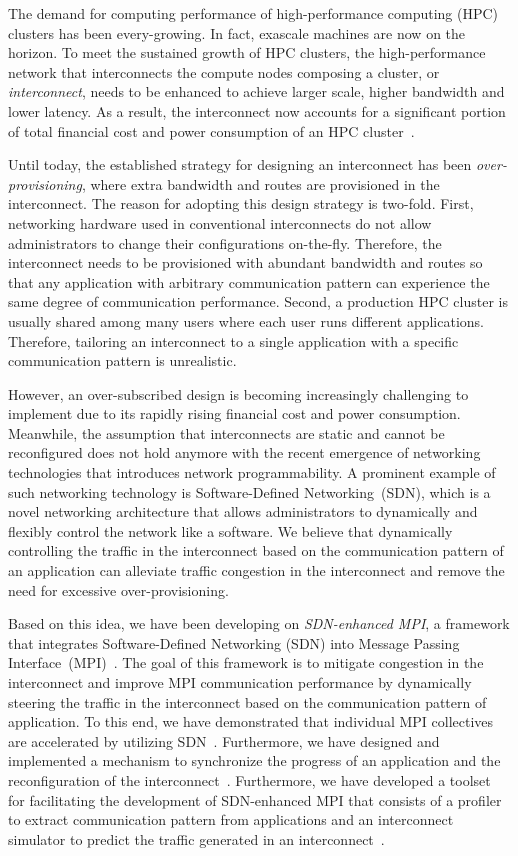\documentclass[graybox]{svmult}
\begin{document}
The demand for computing performance of high-performance computing (HPC)
clusters has been every-growing. In fact, exascale machines are now on the
horizon. To meet the sustained growth of HPC clusters, the high-performance
network that interconnects the compute nodes composing a cluster, or
\textit{interconnect}, needs to be enhanced to achieve larger scale, higher
bandwidth and lower latency. As a result, the interconnect now accounts for a
significant portion of total financial cost and power consumption of an HPC
cluster~\cite{Michelogiannakis2017}.

Until today, the established strategy for designing an interconnect has been
\textit{over-provisioning}, where extra bandwidth and routes are provisioned
in the interconnect. The reason for adopting this design strategy is two-fold.
First, networking hardware used in conventional interconnects do not allow
administrators to change their configurations on-the-fly. Therefore, the
interconnect needs to be provisioned with abundant bandwidth and routes so
that any application with arbitrary communication pattern can experience the
same degree of communication performance. Second, a production HPC cluster is
usually shared among many users where each user runs different applications.
Therefore, tailoring an interconnect to a single application with a specific
communication pattern is unrealistic.

However, an over-subscribed design is becoming increasingly challenging to
implement due to its rapidly rising financial cost and power consumption.
Meanwhile, the assumption that interconnects are static and cannot be
reconfigured does not hold anymore with the recent emergence of networking
technologies that introduces network programmability. A prominent example of
such networking technology is Software-Defined Networking~(SDN), which is a
novel networking architecture that allows administrators to dynamically and
flexibly control the network like a software. We believe that dynamically
controlling the traffic in the interconnect based on the communication pattern
of an application can alleviate traffic congestion in the interconnect and
remove the need for excessive over-provisioning.

Based on this idea, we have been developing on \textit{SDN-enhanced MPI}, a
framework that integrates Software-Defined Networking (SDN) into Message
Passing Interface~(MPI)~\cite{MPIForum2012}. The goal of this framework is to
mitigate congestion in the interconnect and improve MPI communication
performance by dynamically steering the traffic in the interconnect based on
the communication pattern of application. To this end, we have demonstrated
that individual MPI collectives are accelerated by utilizing
SDN~\cite{Dashdavaa2014,Takahashi2014}. Furthermore, we have designed and
implemented a mechanism to synchronize the progress of an application and the
reconfiguration of the interconnect~\cite{Takahashi2015,Takahashi2018}.
Furthermore, we have developed a toolset for facilitating the development of
SDN-enhanced MPI that consists of a profiler to extract communication pattern
from applications and an interconnect simulator to predict the traffic
generated in an interconnect~\cite{Takahashi2017}.
\end{document}
